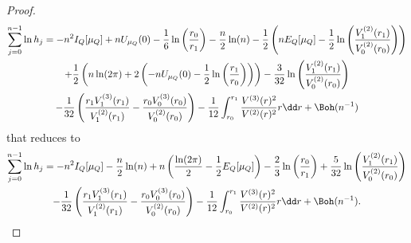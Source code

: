 \begin{proof}
\begin{multline}
			\sum_{j=0}^{n-1} \ln{h_j} = - n^2 I_Q[\mu_Q] + n U_{\mu_Q}(0) - \frac{1}{6} \ln{\left( \frac{r_0}{r_1}\right)}  - \frac{n}{2} \ln(n) - \frac{1}{2}  \left( n E_Q[\mu_Q] -  \frac{1}{2} \ln \left( \frac{V^{(2)}_{1}(r_1)}{V^{(2)}_{0}(r_{0})} \right) \right)	\\ + \frac{1}{2} \left( n \ln(2\pi) + 2 \left( - n U_{\mu_Q}(0) - \frac{1}{2} \ln\left(\frac{r_1}{r_0}\right) \right) \right)
		 	- \frac{3}{32} \ln\left( \frac{V^{(2)}_1(r_1)}{V^{(2)}_0(r_0)} \right) \\ - \frac{1}{32} \left( \frac{r_1  V^{(3)}_1(r_1)}{V^{(2)}_1(r_1)} - \frac{r_0 V^{(3)}_0(r_0)}{V^{(2)}_0(r_0)}\right) - \frac{1}{12} \int_{r_0}^{r_1} \frac{V^{(3)}(r)^2}{V^{(2)}(r)^{2}} r \dd r +  \Boh(n^{-1})
	\end{multline}
	that reduces to
	\begin{multline}
		\sum_{j=0}^{n-1} \ln{h_j} = - n^2 I_Q[\mu_Q] - \frac{n}{2} \ln(n) + n \left(\frac{\ln(2\pi)}{2} - \frac{1}{2} E_Q[\mu_Q]\right) - \frac{2}{3}  \ln{\left( \frac{r_0}{r_1}\right)}  + \frac{5}{32} \ln \left( \frac{V^{(2)}_{1}(r_1)}{V^{(2)}_{0}(r_{0})} \right) \\ - \frac{1}{32} \left( \frac{r_1  V^{(3)}_1(r_1)}{V^{(2)}_1(r_1)} - \frac{r_0 V^{(3)}_0(r_0)}{V^{(2)}_0(r_0)}\right) - \frac{1}{12} \int_{r_0}^{r_1} \frac{V^{(3)}(r)^2}{V^{(2)}(r)^{2}} r \dd r +  \Boh(n^{-1}).
	\end{multline}
\end{proof}


